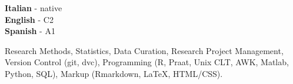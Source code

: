 \documentclass[9pt]{developercv} %
\begin{document}

\begin{minipage}[t]{0.3\textwidth}
	\vspace{-\baselineskip} %


	\textbf{Italian} - native\\
	\textbf{English} - C2 \\
	\textbf{Spanish} - A1
\end{minipage}
\begin{minipage}[t]{0.6\textwidth}
	\vspace{-\baselineskip} %


	Research Methods, Statistics, Data Curation, Research Project Management, Version Control (git, dvc), Programming (R, Praat, Unix CLT, AWK, Matlab, Python, SQL), Markup (Rmarkdown, \LaTeX{}, HTML/CSS).
\end{minipage}


\end{document}
